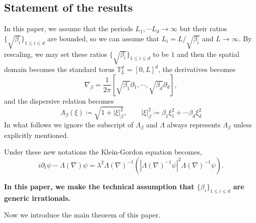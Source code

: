 \subsection{Statement of the results} In this paper, we assume that the periods $L_1,\cdots L_d\rightarrow \infty$ but their ratios
$\{\sqrt{\beta_i}\}_{1\le i\le d}$ are bounded, so we can assume that $L_i=L/\sqrt{\beta_i}$ and $L\rightarrow\infty$. By rescaling, we may set these ratios $\{\sqrt{\beta_i}\}_{1\le i\le d}$ to be $1$ and then the spatial domain becomes the standard torus $\mathbb{T}^d_L=[0,L]^d$, the derivatives becomes
\[
\nabla_\beta =  \frac{1}{2\pi}   [\sqrt{\beta_1} \partial_1,\cdots,\sqrt{\beta_d} \partial_d],
\]
and the dispersive relation becomes
\begin{equation}
    \Lambda_{\beta}(\xi)\coloneqq\sqrt{1+|\xi|_{\beta}^2},\qquad |\xi|_{\beta}^2\coloneqq \beta_1\xi_1^2+\cdots\beta_d\xi_d^2
\end{equation}
In what follows we ignore the subscript of $\Lambda_{\beta}$ and $\Lambda$ always represents $\Lambda_{\beta}$ unless explicitly mentioned.


Under these new notations the Klein-Gordon equation becomes,
\[
i\partial_t\psi-\Lambda(\nabla)\psi=\lambda^2 \Lambda(\nabla)^{-1}(|\Lambda(\nabla)^{-1}\psi|^2\Lambda(\nabla)^{-1}\psi).
\]

\textbf{In this paper, we make the technical assumption that $\{\beta_i\}_{1\le i\le d}$ are generic irrationals.}



\medskip
Now we introduce the main theorem of this paper.

